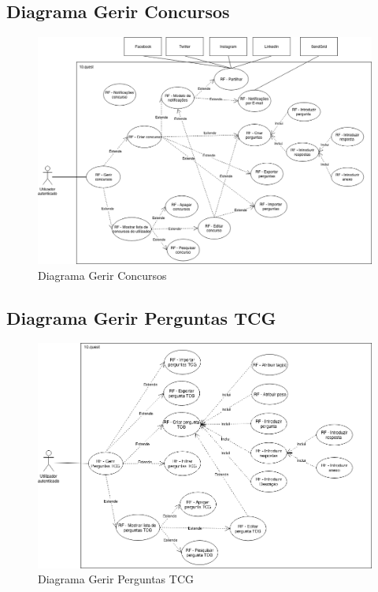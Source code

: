 \newpage

\subsection{Diagrama Gerir Concursos}
\label{d:concursos}
\begin{figure}[ht!]
	\begin{center}
		\includegraphics[width=1\textwidth]{img/rf/gerir-concurso}
		\caption{Diagrama Gerir Concursos}
		\label{fig:rf-gerir-concursos}
	\end{center}
\end{figure}


\newpage


\subsection{Diagrama Gerir Perguntas TCG}
\label{d:perguntastcg}
\begin{figure}[ht!]
	\begin{center}
		\includegraphics[width=1\textwidth]{img/rf/gerir-perguntas-tcg}
		\caption{Diagrama Gerir Perguntas TCG}
		\label{fig:rf-gerir-perguntas-tcg}
	\end{center}
\end{figure}


